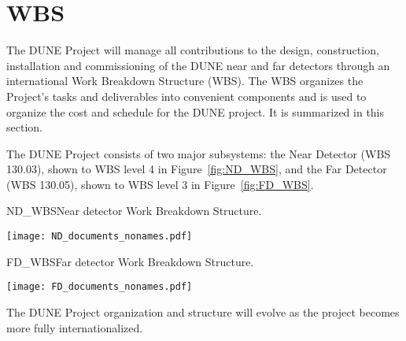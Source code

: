 \section[Work Breakdown Structure (WBS)]{WBS}

The DUNE Project will manage all contributions to the design, construction, installation and
commissioning of the DUNE near and far detectors %
through an international Work Breakdown Structure (WBS). 
The WBS organizes the Project's tasks and deliverables into convenient components and is used to organize the cost and schedule for the DUNE project. It is summarized in this section. 

The DUNE Project consists of two major subsystems: the Near Detector (WBS 130.03), shown to WBS level 4 in Figure~\ref{fig:ND_WBS},  and
the Far Detector (WBS 130.05), shown to WBS level 3 in Figure~\ref{fig:FD_WBS}.

\begin{cdrfigure}{ND_WBS}{Near detector Work Breakdown Structure.}
\centering
\begin{center}
\texttt{[image: ND\_documents\_nonames.pdf]}
\end{center}
\end{cdrfigure}
\begin{cdrfigure}{FD_WBS}{Far detector Work Breakdown Structure.}
\centering
\begin{center}
\texttt{[image: FD\_documents\_nonames.pdf]}
\end{center}
\end{cdrfigure}
The DUNE Project organization and structure will evolve as the project
becomes more fully internationalized.
